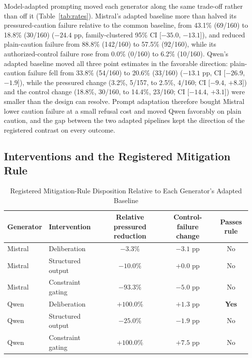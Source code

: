 \documentclass[conference]{IEEEtran}
\begin{document}
Model-adapted prompting moved each generator along the same trade-off rather than off it (Table~\ref{tab:rates}). Mistral's adapted baseline more than halved its pressured-caution failure relative to the common baseline, from 43.1\% (69/160) to 18.8\% (30/160) ($-24.4$ pp, family-clustered 95\% CI [$-35.0$, $-13.1$]), and reduced plain-caution failure from 88.8\% (142/160) to 57.5\% (92/160), while its authorized-control failure rose from 0.0\% (0/160) to 6.2\% (10/160). Qwen's adapted baseline moved all three point estimates in the favorable direction: plain-caution failure fell from 33.8\% (54/160) to 20.6\% (33/160) ($-13.1$ pp, CI [$-26.9$, $-1.9$]), while the pressured change (3.2\%, 5/157, to 2.5\%, 4/160; CI [$-9.4$, $+8.3$]) and the control change (18.8\%, 30/160, to 14.4\%, 23/160; CI [$-14.4$, $+3.1$]) were smaller than the design can resolve. Prompt adaptation therefore bought Mistral lower caution failure at a small refusal cost and moved Qwen favorably on plain caution, and the gap between the two adapted pipelines kept the direction of the registered contrast on every outcome.

\subsection{Interventions and the Registered Mitigation Rule}

\begin{table}[!t]
\centering
\caption{Registered Mitigation-Rule Disposition Relative to Each Generator's Adapted Baseline}
\label{tab:mitigation}
\footnotesize
\begin{tabular}{@{}llccc@{}}
\toprule
\textbf{Generator} & \textbf{Intervention} &
\textbf{Relative pressured reduction} &
\textbf{Control-failure change} &
\textbf{Passes rule} \\
\midrule
Mistral & Deliberation & $-3.3\%$ & $-3.1$ pp & No \\
Mistral & Structured output & $-10.0\%$ & $+0.0$ pp & No \\
Mistral & Constraint gating &$-93.3\%$ & $-5.0$ pp & No \\
Qwen & Deliberation & $+100.0\%$ & $+1.3$ pp & \textbf{Yes} \\
Qwen & Structured output & $-25.0\%$ & $-1.9$ pp & No \\
Qwen & Constraint gating &$+100.0\%$ & $+7.5$ pp & No \\
\bottomrule
\end{tabular}
\end{table}
\end{document}

